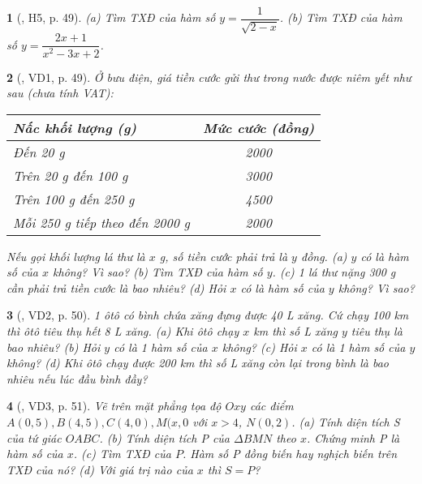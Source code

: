 \documentclass{article}
\newtheorem{baitoan}{}
\begin{document}
\begin{baitoan}[\cite{Binh_boi_duong_Toan_9_tap_1}, H5, p. 49]
	(a) Tìm {\rm TXĐ} của hàm số $y = \dfrac{1}{\sqrt{2 - x}}$. (b) Tìm {\rm TXĐ} của hàm số $y = \dfrac{2x + 1}{x^2 - 3x + 2}$.
\end{baitoan}

\begin{baitoan}[\cite{Binh_boi_duong_Toan_9_tap_1}, VD1, p. 49]
	Ở bưu điện, giá tiền cước gửi thư trong nước được niêm yết như sau (chưa tính {\rm VAT}):
	\begin{table}[H]
		\centering
		\begin{tabular}{|l|c|}
			\hline
			Nấc khối lượng (g) & Mức cước (đồng) \\
			\hline
			Đến 20 g & 2000 \\
			\hline
			Trên 20 g đến 100 g & 3000 \\
			\hline
			Trên 100 g đến 250 g & 4500 \\
			\hline
			Mỗi 250 g tiếp theo đến 2000 g & 2000 \\
			\hline
		\end{tabular}
	\end{table}
	\noindent Nếu gọi khối lượng lá thư là $x$ {\rm g}, số tiền cước phải trả là $y$ đồng. (a) $y$ có là hàm số của $x$ không? Vì sao? (b) Tìm {\rm TXĐ} của hàm số $y$. (c) 1 lá thư nặng {\rm300 g} cần phải trả tiền cước là bao nhiêu? (d) Hỏi $x$ có là hàm số của $y$ không? Vì sao?
\end{baitoan}

\begin{baitoan}[\cite{Binh_boi_duong_Toan_9_tap_1}, VD2, p. 50]
	1 ôtô có bình chứa xăng đựng được {\rm40 L} xăng. Cứ chạy {\rm100 km} thì ôtô tiêu thụ hết {\rm8 L} xăng. (a) Khi ôtô chạy $x$ {\rm km} thì số {\rm L} xăng $y$ tiêu thụ là bao nhiêu? (b) Hỏi $y$ có là 1 hàm số của $x$ không? (c) Hỏi $x$ có là 1 hàm số của $y$ không? (d) Khi ôtô chạy được {\rm200 km} thì số {\rm L} xăng còn lại trong bình là bao nhiêu nếu lúc đầu bình đầy?
\end{baitoan}

\begin{baitoan}[\cite{Binh_boi_duong_Toan_9_tap_1}, VD3, p. 51]
	Vẽ trên mặt phẳng tọa độ $Oxy$ các điểm $A(0,5),B(4,5),C(4,0),M(x,0$ với $x > 4$, $N(0,2)$. (a) Tính diện tích S của tứ giác $OABC$. (b) Tính diện tích P của $\Delta BMN$ theo $x$. Chứng minh P là hàm số của $x$. (c) Tìm {\rm TXĐ} của $P$. Hàm số P đồng biến hay nghịch biến trên {\rm TXĐ} của nó? (d) Với giá trị nào của $x$ thì $S = P$?
\end{baitoan}
\end{document}

